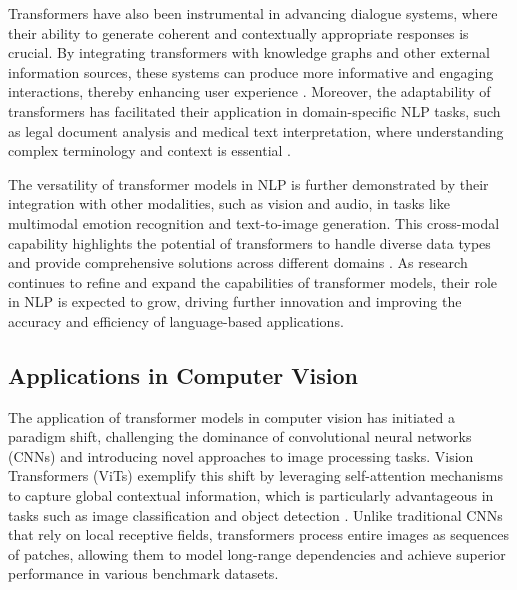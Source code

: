 Transformers have also been instrumental in advancing dialogue systems, where their ability to generate coherent and contextually appropriate responses is crucial. By integrating transformers with knowledge graphs and other external information sources, these systems can produce more informative and engaging interactions, thereby enhancing user experience \cite{chaudhuri2021groundingdialoguesystemsknowledge}. Moreover, the adaptability of transformers has facilitated their application in domain-specific NLP tasks, such as legal document analysis and medical text interpretation, where understanding complex terminology and context is essential \cite{li2023ecomgptinstructiontuninglargelanguage}.



The versatility of transformer models in NLP is further demonstrated by their integration with other modalities, such as vision and audio, in tasks like multimodal emotion recognition and text-to-image generation. This cross-modal capability highlights the potential of transformers to handle diverse data types and provide comprehensive solutions across different domains \cite{zhou2023leveragingtcntransformereffective}. As research continues to refine and expand the capabilities of transformer models, their role in NLP is expected to grow, driving further innovation and improving the accuracy and efficiency of language-based applications.



\subsection{Applications in Computer Vision} \label{subsec:Applications in Computer Vision}

The application of transformer models in computer vision has initiated a paradigm shift, challenging the dominance of convolutional neural networks (CNNs) and introducing novel approaches to image processing tasks. Vision Transformers (ViTs) exemplify this shift by leveraging self-attention mechanisms to capture global contextual information, which is particularly advantageous in tasks such as image classification and object detection \cite{le2019evolvingselfsupervisedneuralnetworks}. Unlike traditional CNNs that rely on local receptive fields, transformers process entire images as sequences of patches, allowing them to model long-range dependencies and achieve superior performance in various benchmark datasets.



